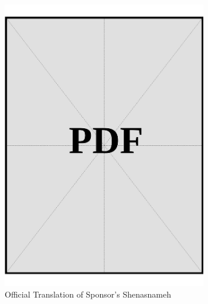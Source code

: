 \begin{figure}[h]
    \centering
    \includegraphics[page=1, width=0.8\textwidth]{../docs/sponsor/identification/shenasnameh/official-translations.pdf}
    \caption{Official Translation of Sponsor's Shenasnameh}
    \label{fig:sponsor-shenasnameh-official-translation}
\end{figure}
\vspace*{\fill}
\clearpage


